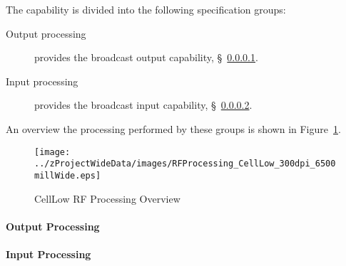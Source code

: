 The \ThisSys \ThisSegment \CellLow capability is divided into the following specification groups:
\begin{description}
	\item[Output processing] provides the \CellLow broadcast output capability, \S~\ref{loc:RF_CellLow_Output}.
	\item[Input processing]  provides the \CellLow broadcast input  capability, \S~\ref{loc:RF_CellLow_Input}.
\end{description}
An overview the processing performed by these groups is shown in Figure~\ref{fig:CellLow_RF_Processing}.
\begin{figure}[htbp]
	\centering
		\texttt{[image: ../zProjectWideData/images/RFProcessing\_CellLow\_300dpi\_6500millWide.eps]}
	\caption[CellLow RF Processing Overview]{CellLow RF Processing Overview}
	\label{fig:CellLow_RF_Processing}
\end{figure}

\KNEADPARAGRAPHNEWPAGE
\paragraph{\CellLow \RF Output Processing}
\label{loc:RF_CellLow_Output}
\renewcommand{\ThisSubSegment}{\CellLow \RF Output Processing\xspace}%


\KNEADPARAGRAPHNEWPAGE
\paragraph{\CellLow \RF Input Processing}
\label{loc:RF_CellLow_Input}
\renewcommand{\ThisSubSegment}{\CellLow \RF Input Processing\xspace}%

